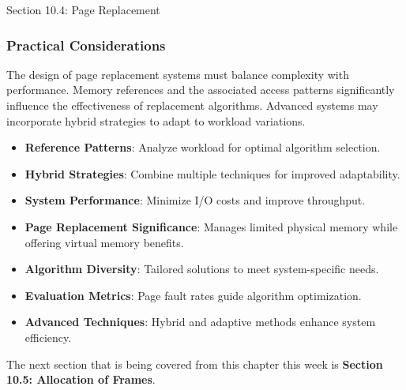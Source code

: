 \begin{notes}{Section 10.4: Page Replacement}
    \subsubsection*{Practical Considerations}
    
    The design of page replacement systems must balance complexity with performance. Memory references and the associated access patterns significantly influence the effectiveness of replacement algorithms. 
    Advanced systems may incorporate hybrid strategies to adapt to workload variations.
    
    \begin{highlight}
        \begin{itemize}
            \item \textbf{Reference Patterns}: Analyze workload for optimal algorithm selection.
            \item \textbf{Hybrid Strategies}: Combine multiple techniques for improved adaptability.
            \item \textbf{System Performance}: Minimize I/O costs and improve throughput.
        \end{itemize}
    \end{highlight}
    
    \begin{highlight}
        \begin{itemize}
            \item \textbf{Page Replacement Significance}: Manages limited physical memory while offering virtual memory benefits.
            \item \textbf{Algorithm Diversity}: Tailored solutions to meet system-specific needs.
            \item \textbf{Evaluation Metrics}: Page fault rates guide algorithm optimization.
            \item \textbf{Advanced Techniques}: Hybrid and adaptive methods enhance system efficiency.
        \end{itemize}
    \end{highlight}
\end{notes}

The next section that is being covered from this chapter this week is \textbf{Section 10.5: Allocation of Frames}.

